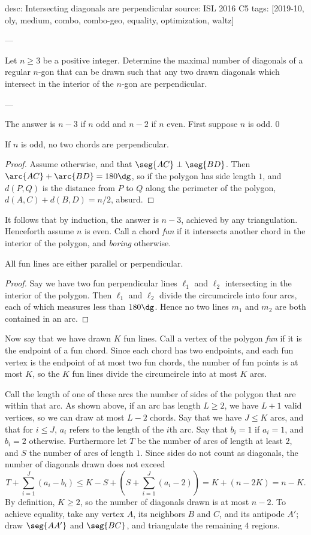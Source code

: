 desc: Intersecting diagonals are perpendicular
source: ISL 2016 C5
tags: [2019-10, oly, medium, combo, combo-geo, equality, optimization, waltz]

---

Let $n\ge3$ be a positive integer. Determine the maximal number of diagonals of a regular $n$-gon that can be drawn such that any two drawn diagonals which intersect in the interior of the $n$-gon are perpendicular.

---

The answer is $n-3$ if $n$ odd and $n-2$ if $n$ even. First suppose $n$ is odd.
\setcounter{claim}0
\begin{claim}
    If $n$ is odd, no two chords are perpendicular.
\end{claim}
\begin{proof}
    Assume otherwise, and that $\seg{AC}\perp\seg{BD}$. Then $\arc{AC}+\arc{BD}=180\dg$, so if the polygon has side length $1$, and $d(P,Q)$ is the distance from $P$ to $Q$ along the perimeter of the polygon, $d(A,C)+d(B,D)=n/2$, absurd.
\end{proof}

It follows that by induction, the answer is $n-3$, achieved by any triangulation. Henceforth assume $n$ is even. Call a chord \emph{fun} if it intersects another chord in the interior of the polygon, and \emph{boring} otherwise.
\begin{claim}
    All fun lines are either parallel or perpendicular.
\end{claim}
\begin{proof}
    Say we have two fun perpendicular lines $\ell_1$ and $\ell_2$ intersecting in the interior of the polygon. Then $\ell_1$ and $\ell_2$ divide the circumcircle into four arcs, each of which measures less than $180\dg$. Hence no two lines $m_1$ and $m_2$ are both contained in an arc.
\end{proof}

Now say that we have drawn $K$ fun lines. Call a vertex of the polygon \emph{fun} if it is the endpoint of a fun chord. Since each chord has two endpoints, and each fun vertex is the endpoint of at most two fun chords, the number of fun points is at most $K$, so the $K$ fun lines divide the circumcircle into at most $K$ arcs.

Call the length of one of these arcs the number of sides of the polygon that are within that arc. As shown above, if an arc has length $L\ge2$, we have $L+1$ valid vertices, so we can draw at most $L-2$ chords. Say that we have $J\le K$ arcs, and that for $i\le J$, $a_i$ refers to the length of the $i$th arc. Say that $b_i=1$ if $a_i=1$, and $b_i=2$ otherwise. Furthermore let $T$ be the number of arcs of length at least $2$, and $S$ the number of arcs of length $1$. Since sides do not count as diagonals, the number of diagonals drawn does not exceed \[T+\sum_{i=1}^J(a_i-b_i)\le K-S+\left(S+\sum_{i=1}^J(a_i-2)\right)=K+(n-2K)=n-K.\]
By definition, $K\ge2$, so the number of diagonals drawn is at most $n-2$. To achieve equality, take any vertex $A$, its neighbors $B$ and $C$, and its antipode $A'$; draw $\seg{AA'}$ and $\seg{BC}$, and triangulate the remaining $4$ regions.
